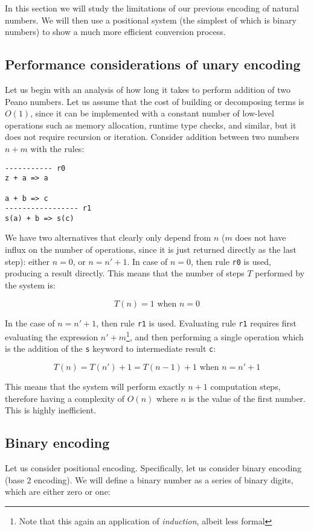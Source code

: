 In this section we will study the limitations of our previous encoding of natural numbers. We will then use a positional system (the simplest of which is binary numbers) to show a much more efficient conversion process.

\subsection{Performance considerations of unary encoding}
Let us begin with an analysis of how long it takes to perform addition of two Peano numbers. Let us assume that the cost of building or decomposing terms is $O(1)$, since it can be implemented with a constant number of low-level operations such as memory allocation, runtime type checks, and similar, but it does not require recursion or iteration. Consider addition between two numbers $n + m$ with the rules:

\begin{lstlisting}
----------- r0
z + a => a

a + b => c
----------------- r1
s(a) + b => s(c)
\end{lstlisting}

We have two alternatives that clearly only depend from $n$ ($m$ does not have influx on the number of operations, since it is just returned directly as the last step): either $n=0$, or $n=n'+1$. In case of $n=0$, then rule \texttt{r0} is used, producing a result directly. This means that the number of steps $T$ performed by the system is:

$$T(n) = 1 \text{ when } n=0$$

In the case of $n=n'+1$, then rule \texttt{r1} is used. Evaluating rule \texttt{r1} requires first evaluating the expression $n'+m$\footnote{Note that this again an application of \textit{induction}, albeit less formal}, and then performing a single operation which is the addition of the \texttt{s} keyword to intermediate result \texttt{c}:

$$T(n) = T(n') + 1 = T(n-1) + 1 \text{ when } n=n'+1$$

This means that the system will perform exactly $n+1$ computation steps, therefore having a complexity of $O(n)$ where $n$ is the value of the first number. This is highly inefficient.

\subsection{Binary encoding}
Let us consider positional encoding. Specifically, let us consider binary encoding (base 2 encoding). We will define a binary number as a series of binary digits, which are either zero or one:

